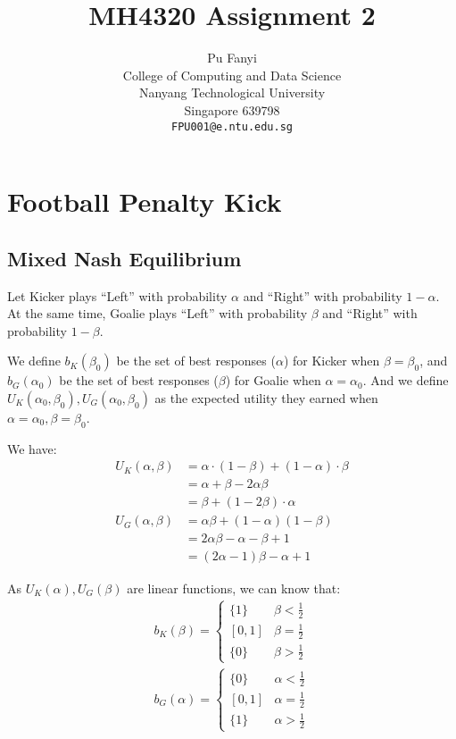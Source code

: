 \documentclass{article}
\title{MH4320 Assignment 2}
\author{%
	Pu Fanyi \\
	College of Computing and Data Science\\
	Nanyang Technological University\\
	Singapore 639798 \\
	\texttt{FPU001@e.ntu.edu.sg} \\
}
\begin{document}
	
	
	\maketitle	
	
	\section{Football Penalty Kick}

    \subsection{Mixed Nash Equilibrium}

    \label{sec:football}

    Let Kicker plays ``Left'' with probability $\alpha$ and ``Right'' with probability $1-\alpha$. At the same time, Goalie plays ``Left'' with probability $\beta$ and ``Right'' with probability $1-\beta$.

    We define $b_K(\beta_0)$ be the set of best responses ($\alpha$) for Kicker when $\beta=\beta_0$, and $b_G(\alpha_0)$ be the set of best responses ($\beta$) for Goalie when $\alpha=\alpha_0$. And we define $U_K(\alpha_0, \beta_0), U_G(\alpha_0, \beta_0)$ as the expected utility they earned when $\alpha=\alpha_0, \beta=\beta_0$.

    We have:
    \begin{align*}
    U_K(\alpha, \beta) &= \alpha\cdot(1-\beta)+(1-\alpha)\cdot\beta\\
    &=\alpha+\beta-2\alpha\beta\\
    &=\beta+(1-2\beta)\cdot\alpha\\
    U_G(\alpha, \beta)&=\alpha\beta+(1-\alpha)(1-\beta)\\
    &=2\alpha\beta-\alpha-\beta+1\\
    &=(2\alpha-1)\beta-\alpha+1
    \end{align*}

    As $U_K(\alpha), U_G(\beta)$ are linear functions, we can know that:
    \begin{align*}
        b_K(\beta)=\begin{cases}
            \{1\}&\beta<\frac{1}{2}\\
            [0, 1]&\beta=\frac{1}{2}\\
            \{0\}&\beta>\frac{1}{2}
        \end{cases}\\
        b_G(\alpha)=\begin{cases}
            \{0\}&\alpha<\frac{1}{2}\\
            [0, 1]&\alpha=\frac{1}{2}\\
            \{1\}&\alpha>\frac{1}{2}
        \end{cases}
    \end{align*}
\end{document}
